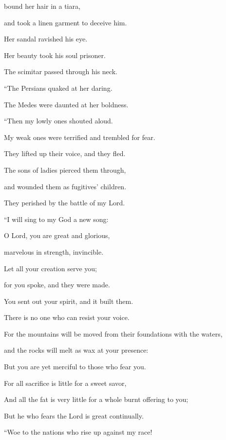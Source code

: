 {\par }{\QB bound her hair in a tiara,
\par }{\QB and took a linen garment to deceive him.
\par }{\Q {}Her sandal ravished his eye.
\par }{\QB Her beauty took his soul prisoner.
\par }{\QB The scimitar passed through his neck.
\par }{\Q {}“The Persians quaked at her daring.
\par }{\QB The Medes were daunted at her boldness.
\par }{\BB \par }{\Q {}“Then my lowly ones shouted aloud.
\par }{\QB My weak ones were terrified and trembled for fear.
\par }{\QB They lifted up their voice, and they fled.
\par }{\Q {}The sons of ladies pierced them through,
\par }{\QB and wounded them as fugitives’ children.
\par }{\QB They perished by the battle of my Lord.
\par }{\BB \par }{\Q {}“I will sing to my God a new song:
\par }{\QB O Lord, you are great and glorious,
\par }{\QB marvelous in strength, invincible.
\par }{\Q {}Let all your creation serve you;
\par }{\QB for you spoke, and they were made.
\par }{\Q You sent out your spirit, and it built them.
\par }{\QB There is no one who can resist your voice.
\par }{\Q {}For the mountains will be moved from their foundations with the waters,
\par }{\QB and the rocks will melt as wax at your presence:
\par }{\QB But you are yet merciful to those who fear you.
\par }{\Q {}For all sacrifice is little for a sweet savor,
\par }{\QB And all the fat is very little for a whole burnt offering to you;
\par }{\QB But he who fears the Lord is great continually.
\par }{\BB \par }{\Q {}“Woe to the nations who rise up against my race!
}
